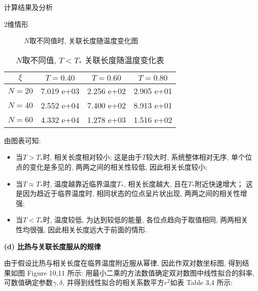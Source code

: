 \documentclass{article}
\begin{document}
\begin{section}{计算结果及分析}
\begin{subsection}{2维情形}
\begin{figure}
        
        \caption{$N$取不同值时, 关联长度随温度变化图}
    \end{figure}

    \begin{table}[!htbp]
        \centering
        \begin{tabular}{c|ccc}
        $\xi$  & $T=0.40$   & $T=0.60$   & $T=0.80$  \\ \hline
        $N=20$ & 7.019 e+03  & 2.256 e+02  & 2.905 e+01 \\
        $N=40$ & 2.552 e+04 & 7.400 e+02  & 8.913 e+01 \\
        $N=60$ & 4.332 e+04 & 1.278 e+03 & 1.516 e+02 \\ \hline
        \end{tabular}
        \caption{$N$取不同值, $T<T_\ast$ 关联长度随温度变化表}
    \end{table}

    由图表可知:
    \begin{itemize}
        \item 当$T>T_\ast$时, 相关长度相对较小; 这是由于$T$较大时, 系统整体相对无序, 单个位点的变化是多见的, 两两之间的相关性较低, 因此相关长度较小; 
        \item 当$T\approx T_\ast$时, 温度越靠近临界温度$T_\ast$, 相关长度越大, 且在$T_\ast$附近快速增大； 这是因为趋近于临界温度时, 相同状态的位点呈片状出现, 两两之间的相关性增强;
        \item 当$T<T_\ast$时, 温度较低, 为达到较低的能量, 各位点趋向于取值相同, 两两相关性均很强, 因此相关长度远大于前面的情形.
    \end{itemize}

    \noindent\textbf{(d) 比热与关联长度服从的规律}

    由于假设比热与相关长度在临界温度附近服从幂律, 因此作双对数坐标图, 得到结果如图 Figure 10,11 所示:
    用最小二乘的方法数值确定双对数图中线性拟合的斜率, 可数值确定参数$\gamma,\delta$, 并得到线性拟合的相关系数平方$r^2$如表 Table 3,4 所示:


\end{subsection}
\end{section}
\end{document}
